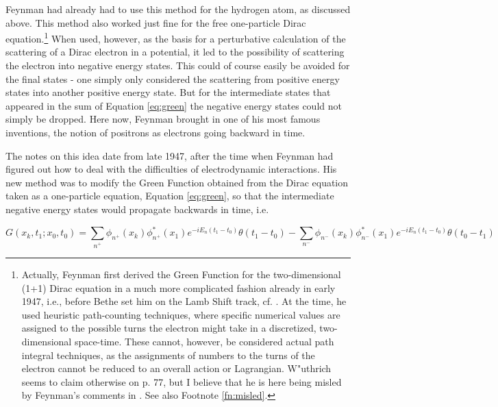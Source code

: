 \documentclass[12pt,a4paper]{article}
\begin{document}
Feynman had already had to use this method for the hydrogen atom, as discussed above. This method also worked just fine for the free one-particle Dirac equation.\footnote{Actually, Feynman first derived the Green Function for the two-dimensional (1+1) Dirac equation in a much more complicated fashion already in early 1947, i.e., before Bethe set him on the Lamb Shift track, cf. \citep[sec. 4.1.3]{wuethrich_2010_the-genesis}. At the time, he used heuristic path-counting techniques, where specific numerical values are assigned to the possible turns the electron might take in a discretized, two-dimensional space-time. These cannot, however, be considered actual path integral techniques, as the assignments of numbers to the turns of the electron cannot be reduced to an overall action or Lagrangian. W"uthrich seems to claim otherwise on p. 77, but I believe that he is here being misled by Feynman's comments in \cite{feynman_1948_space-time}. See also Footnote \ref{fn:misled}.} When used, however, as the basis for a perturbative calculation of the scattering of a Dirac electron in a potential, it led to the possibility of scattering the electron into negative energy states. This could of course easily be avoided for the final states - one simply only considered the scattering from positive energy states into another positive energy state. But for the intermediate states that appeared in the sum of Equation \ref{eq:green} the negative energy states could not simply be dropped. Here now, Feynman brought in one of his most famous inventions, the notion of positrons as electrons going backward in time.

The notes on this idea date from late 1947, after the time when Feynman had figured out how to deal with the difficulties of electrodynamic interactions. His new method was to modify the Green Function obtained from the Dirac equation taken as a one-particle equation, Equation \ref{eq:green}, so that the intermediate negative energy states would propagate backwards in time, i.e.

\begin{equation}
\label{eq:green2}
G(x_k, t_1; x_0, t_0) = \sum_{n^{+}} \phi_{n^{+}} (x_k) \phi_{n^{+}}^{\ast} (x_1) e^{-i E_n (t_1 - t_0)} \theta (t_1-t_0) - \sum_{n^{-}} \phi_{n^{-}} (x_k) \phi_{n^{-}}^{\ast} (x_1) e^{- i E_n (t_1 - t_0)} \theta (t_0-t_1)
\end{equation}
\end{document}
